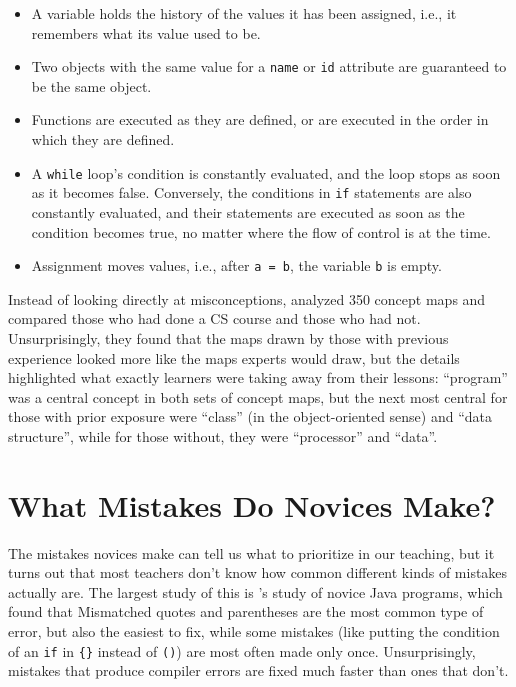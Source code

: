 \begin{itemize}

\item
  A variable holds the history of the values it has been assigned,
  i.e., it remembers what its value used to be.

\item
  Two objects with the same value for a \texttt{name} or \texttt{id}
  attribute are guaranteed to be the same object.

\item
  Functions are executed as they are defined, or are executed in the
  order in which they are defined.

\item
  A \texttt{while} loop's condition is constantly evaluated, and the
  loop stops as soon as it becomes false.  Conversely, the conditions
  in \texttt{if} statements are also constantly evaluated, and their
  statements are executed as soon as the condition becomes true, no
  matter where the flow of control is at the time.

\item
  Assignment moves values, i.e., after \texttt{a = b}, the variable
  \texttt{b} is empty.

\end{itemize}

Instead of looking directly at misconceptions, \cite{Muhl2016}
analyzed 350 concept maps and compared those who had done a CS course
and those who had not.  Unsurprisingly, they found that the maps drawn
by those with previous experience looked more like the maps experts
would draw, but the details highlighted what exactly learners were
taking away from their lessons: ``program'' was a central concept in
both sets of concept maps, but the next most central for those with
prior exposure were ``class'' (in the object-oriented sense) and
``data structure'', while for those without, they were ``processor''
and ``data''.

\section{What Mistakes Do Novices Make?}\label{s:pck-mistakes}

The mistakes novices make can tell us what to prioritize in our
teaching, but it turns out that most teachers don't know how common
different kinds of mistakes actually are.  The largest study of this
is \cite{Brow2017}'s study of novice Java programs, which found that
Mismatched quotes and parentheses are the most common type of error,
but also the easiest to fix, while some mistakes (like putting the
condition of an \texttt{if} in \texttt{\{\}} instead of \texttt{()})
are most often made only once.  Unsurprisingly, mistakes that produce
compiler errors are fixed much faster than ones that don't.

